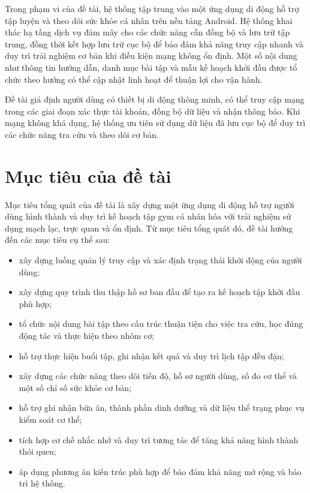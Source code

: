 Trong phạm vi của đề tài, hệ thống tập trung vào một ứng dụng di động hỗ trợ tập luyện và theo dõi sức khỏe cá nhân trên nền tảng Android. Hệ thống khai thác hạ tầng dịch vụ đám mây cho các chức năng cần đồng bộ và lưu trữ tập trung, đồng thời kết hợp lưu trữ cục bộ để bảo đảm khả năng truy cập nhanh và duy trì trải nghiệm cơ bản khi điều kiện mạng không ổn định. Một số nội dung như thông tin hướng dẫn, danh mục bài tập và mẫu kế hoạch khởi đầu được tổ chức theo hướng có thể cập nhật linh hoạt để thuận lợi cho vận hành.

Đề tài giả định người dùng có thiết bị di động thông minh, có thể truy cập mạng trong các giai đoạn xác thực tài khoản, đồng bộ dữ liệu và nhận thông báo. Khi mạng không khả dụng, hệ thống ưu tiên sử dụng dữ liệu đã lưu cục bộ để duy trì các chức năng tra cứu và theo dõi cơ bản.

\section{Mục tiêu của đề tài}

Mục tiêu tổng quát của đề tài là xây dựng một ứng dụng di động hỗ trợ người dùng hình thành và duy trì kế hoạch tập gym cá nhân hóa với trải nghiệm sử dụng mạch lạc, trực quan và ổn định. Từ mục tiêu tổng quát đó, đề tài hướng đến các mục tiêu cụ thể sau:

\begin{itemize}
    \item xây dựng luồng quản lý truy cập và xác định trạng thái khởi động của người dùng;
    \item xây dựng quy trình thu thập hồ sơ ban đầu để tạo ra kế hoạch tập khởi đầu phù hợp;
    \item tổ chức nội dung bài tập theo cấu trúc thuận tiện cho việc tra cứu, học đúng động tác và thực hiện theo nhóm cơ;
    \item hỗ trợ thực hiện buổi tập, ghi nhận kết quả và duy trì lịch tập đều đặn;
    \item xây dựng các chức năng theo dõi tiến độ, hồ sơ người dùng, số đo cơ thể và một số chỉ số sức khỏe cơ bản;
    \item hỗ trợ ghi nhận bữa ăn, thành phần dinh dưỡng và dữ liệu thể trạng phục vụ kiểm soát cơ thể;
    \item tích hợp cơ chế nhắc nhở và duy trì tương tác để tăng khả năng hình thành thói quen;
    \item áp dụng phương án kiến trúc phù hợp để bảo đảm khả năng mở rộng và bảo trì hệ thống.
\end{itemize}

